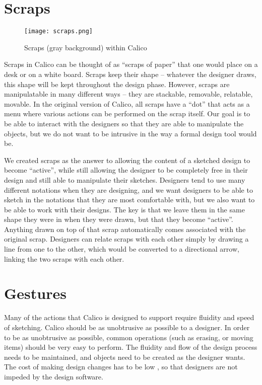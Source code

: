 \section{Scraps}

\begin{figure}[htb]
  \centering
  \texttt{[image: scraps.png]}
  \caption{Scraps (gray background) within Calico}
  \label{fig:scraps}
\end{figure}

Scraps in Calico can be thought of as ``scraps of paper'' that one would place on a desk or on a white board.
Scraps keep their shape -- whatever the designer draws, this shape will be kept throughout the design phase.
However, scraps are manipulatable in many different ways -- they are stackable, removable, relatable, movable. 
In the original version of Calico, all scraps have a ``dot'' that acts as a menu where various actions can be performed on the scrap itself.
Our goal is to be able to interact with the designers so that they are able to manipulate the objects, but we do not want to be intrusive in the way a formal design tool would be.

We created scraps as the answer to allowing the content of a sketched design to become ``active'', while still allowing the designer to be completely free in their design and still able to manipulate their sketches.
Designers tend to use many different notations when they are designing, and we want designers to be able to sketch in the notations that they are most comfortable with, but we also want to be able to work with their designs.
The key is that we leave them in the same shape they were in when they were drawn, but that they become ``active''. 
Anything drawn on top of that scrap automatically comes associated with the original scrap.
Designers can relate scraps with each other simply by drawing a line from one to the other, which would be converted to a directional arrow, linking the two scraps with each other.



\section{Gestures}
Many of the actions that Calico is designed to support require fluidity and speed of sketching. Calico should be as unobtrusive as possible to a designer. In order to be as unobtrusive as possible, common operations (such as erasing, or moving items) should be very easy to perform. The fluidity and flow of the design process needs to be maintained, and objects need to be created as the designer wants. The cost of making design changes has to be low \cite{petre}, so that designers are not impeded by the design software.

